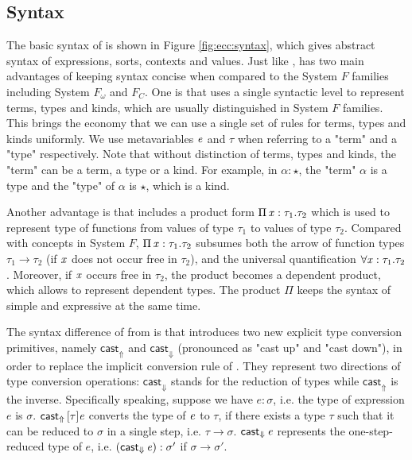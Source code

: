 \subsection{Syntax}\label{sec:ecc:syn}
The basic syntax of \expcc is shown in Figure \ref{fig:ecc:syntax}, which gives abstract syntax of expressions, sorts, contexts and values. Just like \cc, \expcc has two main advantages of keeping syntax concise when compared to the System $F$ families including System $F_\omega$ and $F_C$. One is that \expcc uses a single syntactic level to represent terms, types and kinds, which are usually distinguished in System $F$ families. This brings the economy that we can use a single set of rules for terms, types and kinds uniformly. We use metavariables $\mathit{e}$ and $\tau$ when referring to a "term" and a "type" respectively. Note that without distinction of terms, types and kinds, the "term" can be a term, a type or a kind. For example, in $\alpha :  \star $, the "term" $\alpha$ is a type and the "type" of $\alpha$ is $ \star $, which is a kind.

Another advantage is that \expcc includes a product form $\Pi \, \mathit{x}  :  \tau_{{\mathrm{1}}}  .  \tau_{{\mathrm{2}}}$ which is used to represent type of functions from values of type $\tau_{{\mathrm{1}}}$ to values of type $\tau_{{\mathrm{2}}}$. Compared with concepts in System $F$, $\Pi \, \mathit{x}  :  \tau_{{\mathrm{1}}}  .  \tau_{{\mathrm{2}}}$ subsumes both the arrow of function types $\tau_{{\mathrm{1}}}  \rightarrow  \tau_{{\mathrm{2}}}$ (if $\mathit{x}$ does not occur free in $\tau_{{\mathrm{2}}}$), and the universal quantification $\forall \mathit{x}:\tau_{{\mathrm{1}}}.\tau_{{\mathrm{2}}}$. Moreover, if $\mathit{x}$ occurs free in $\tau_{{\mathrm{2}}}$, the product becomes a dependent product, which allows to represent dependent types. The product $ \Pi $ keeps the syntax of \expcc simple and expressive at the same time.

The syntax difference of from \cc is that \expcc introduces two new explicit type conversion primitives, namely $ \mathsf{cast}_{\Uparrow} $ and $ \mathsf{cast}_{\Downarrow} $ (pronounced as "cast up" and "cast down"), in order to replace the implicit conversion rule of \cc. They represent two directions of type conversion operations: $ \mathsf{cast}_{\Downarrow} $ stands for the reduction of types while $ \mathsf{cast}_{\Uparrow} $ is the inverse. Specifically speaking, suppose we have $e:\sigma$, i.e. the type of expression $e$ is $\sigma$. $\mathsf{cast}_{\Uparrow} \, [  \tau  ]  \mathit{e}$ converts the type of $\mathit{e}$ to $\tau$, if there exists a type $\tau$ such that it can be reduced to $\sigma$ in a single step, i.e. $\tau  \longrightarrow  \sigma$. $\mathsf{cast}_{\Downarrow} \, \mathit{e}$ represents the one-step-reduced type of $e$, i.e. $(\mathsf{cast}_{\Downarrow} \, \mathit{e}) : \sigma'$ if $\sigma  \longrightarrow  \sigma'$.

